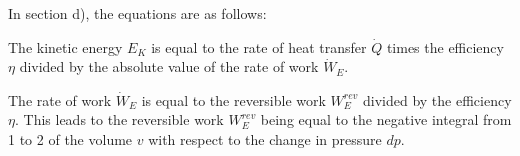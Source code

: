 In section d), the equations are as follows:

The kinetic energy \( E_K \) is equal to the rate of heat transfer \( \dot{Q} \) times the efficiency \( \eta \) divided by the absolute value of the rate of work \( \dot{W}_E \).

The rate of work \( \dot{W}_E \) is equal to the reversible work \( W_E^{rev} \) divided by the efficiency \( \eta \). This leads to the reversible work \( W_E^{rev} \) being equal to the negative integral from 1 to 2 of the volume \( v \) with respect to the change in pressure \( dp \).